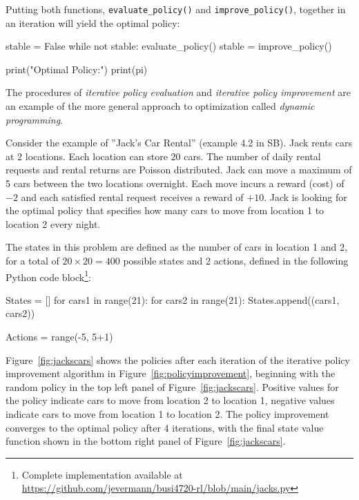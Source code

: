 Putting both functions, \texttt{evaluate\_policy()} and \texttt{improve\_policy()}, together in an iteration will yield the optimal policy:

\begin{pythoncode}
stable = False
while not stable:
    evaluate_policy()
    stable = improve_policy()

print("Optimal Policy:")
print(pi)
\end{pythoncode}

The procedures of \emph{iterative policy evaluation} and \emph{iterative policy improvement} are an example of the more general approach to optimization called \emph{dynamic programming}.

Consider the example of ''Jack's Car Rental'' (example 4.2 in SB). Jack rents cars at 2 locations. Each location can store 20 cars. The number of daily rental requests and rental returns are Poisson distributed. Jack can move a maximum of 5 cars between the two locations overnight. Each move incurs a reward (cost) of $-2$ and each satisfied rental request receives a reward of $+10$. Jack is looking for the optimal policy that specifies how many cars to move from location 1 to location 2 every night. 

The states in this problem are defined as the number of cars in location 1 and 2, for a total of $20 \times 20 = 400$ possible states and 2 actions, defined in the following Python code block\footnote{Complete implementation available at \url{https://github.com/jevermann/busi4720-rl/blob/main/jacks.py}}:

\begin{pythoncode}
States = []
for cars1 in range(21):
    for cars2 in range(21):
        States.append((cars1, cars2))
        
Actions = range(-5, 5+1)
\end{pythoncode}

Figure~\ref{fig:jackscars} shows the policies after each iteration of the iterative policy improvement algorithm in Figure~\ref{fig:policyimprovement}, beginning with the random policy in the top left panel of Figure~\ref{fig:jackscars}. Positive values for the policy indicate cars to move from location 2 to location 1, negative values indicate cars to move from location 1 to location 2. The policy improvement converges to the optimal policy after 4 iterations, with the final state value function shown in the bottom right panel of Figure~\ref{fig:jackscars}.

